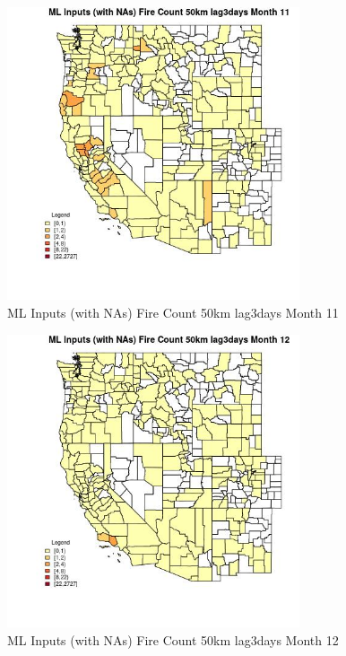 \begin{figure} 
\centering  
\includegraphics[width=0.77\textwidth]{Code_Outputs/Report_ML_input_PM25_Step4_part_f_de_duplicated_aveswNAs_CountyFire_Count_50km_lag3daysmedianMonth11.jpg} 
\caption{\label{fig:Report_ML_input_PM25_Step4_part_f_de_duplicated_aveswNAsCountyFire_Count_50km_lag3daysmedianMonth11}ML Inputs (with NAs) Fire Count 50km lag3days Month 11} 
\end{figure} 
 

\begin{figure} 
\centering  
\includegraphics[width=0.77\textwidth]{Code_Outputs/Report_ML_input_PM25_Step4_part_f_de_duplicated_aveswNAs_CountyFire_Count_50km_lag3daysmedianMonth12.jpg} 
\caption{\label{fig:Report_ML_input_PM25_Step4_part_f_de_duplicated_aveswNAsCountyFire_Count_50km_lag3daysmedianMonth12}ML Inputs (with NAs) Fire Count 50km lag3days Month 12} 
\end{figure} 
 

